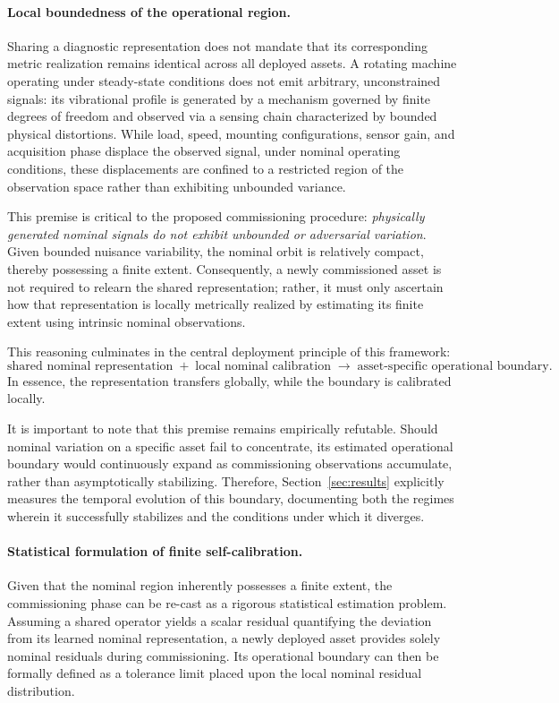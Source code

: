 \documentclass[a4paper]{cas-sc}
\begin{document}
\paragraph{Local boundedness of the operational region.}
Sharing a diagnostic representation does not mandate that its corresponding metric realization remains identical across all deployed assets. A rotating machine operating under steady-state conditions does not emit arbitrary, unconstrained signals: its vibrational profile is generated by a mechanism governed by finite degrees of freedom and observed via a sensing chain characterized by bounded physical distortions. While load, speed, mounting configurations, sensor gain, and acquisition phase displace the observed signal, under nominal operating conditions, these displacements are confined to a restricted region of the observation space rather than exhibiting unbounded variance.

This premise is critical to the proposed commissioning procedure: \emph{physically generated nominal signals do not exhibit unbounded or adversarial variation}. Given bounded nuisance variability, the nominal orbit is relatively compact, thereby possessing a finite extent. Consequently, a newly commissioned asset is not required to relearn the shared representation; rather, it must only ascertain how that representation is locally metrically realized by estimating its finite extent using intrinsic nominal observations.

This reasoning culminates in the central deployment principle of this framework:
\[
\boxed{
\text{shared nominal representation}
\;+\;
\text{local nominal calibration}
\;\longrightarrow\;
\text{asset-specific operational boundary}.
}
\]
In essence, the representation transfers globally, while the boundary is calibrated locally.

It is important to note that this premise remains empirically refutable. Should nominal variation on a specific asset fail to concentrate, its estimated operational boundary would continuously expand as commissioning observations accumulate, rather than asymptotically stabilizing. Therefore, Section~\ref{sec:results} explicitly measures the temporal evolution of this boundary, documenting both the regimes wherein it successfully stabilizes and the conditions under which it diverges.

\paragraph{Statistical formulation of finite self-calibration.}
Given that the nominal region inherently possesses a finite extent, the commissioning phase can be re-cast as a rigorous statistical estimation problem. Assuming a shared operator yields a scalar residual quantifying the deviation from its learned nominal representation, a newly deployed asset provides solely nominal residuals during commissioning. Its operational boundary can then be formally defined as a tolerance limit placed upon the local nominal residual distribution.
\end{document}

